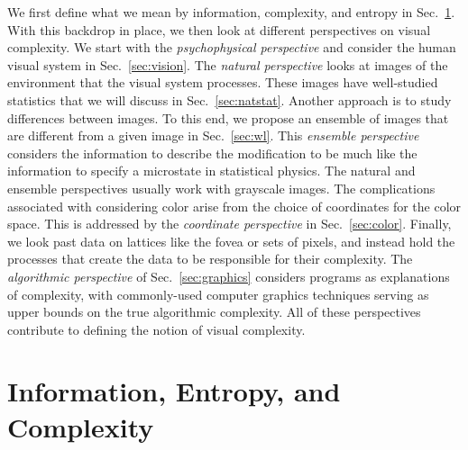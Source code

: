\documentclass[aps,reprint,floatfix]{revtex4-2}
\theoremstyle{plain}
\theoremstyle{definition}
\begin{document}
We first define what we mean by information, complexity, and entropy in
Sec.~\ref{sec:bg}. With this backdrop in place, we then look at different
perspectives on visual complexity. We start with the \emph{psychophysical
perspective} and consider the human visual system in Sec.~\ref{sec:vision}. The
\emph{natural perspective} looks at images of the environment that the visual
system processes. These images have well-studied statistics that we will discuss
in Sec.~\ref{sec:natstat}. Another approach is to study differences between
images. To this end, we propose an ensemble of images that are different from a
given image in Sec.~\ref{sec:wl}. This \emph{ensemble perspective} considers the
information to describe the modification to be much like the information to
specify a microstate in statistical physics. The natural and ensemble
perspectives usually work with grayscale images. The complications associated
with considering color arise from the choice of coordinates for the color space.
This is addressed by the \emph{coordinate perspective} in Sec.~\ref{sec:color}.
Finally, we look past data on lattices like the fovea or sets of pixels, and
instead hold the processes that create the data to be responsible for their
complexity. The \emph{algorithmic perspective} of Sec.~\ref{sec:graphics}
considers programs as explanations of complexity, with commonly-used computer
graphics techniques serving as upper bounds on the true algorithmic complexity.
All of these perspectives contribute to defining the notion of visual
complexity.


\section{Information, Entropy, and Complexity}\label{sec:bg}
\end{document}
